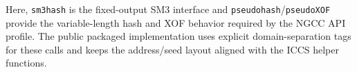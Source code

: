Here, \texttt{sm3hash} is the fixed-output SM3 interface and
\texttt{pseudohash}/\texttt{pseudoXOF} provide the variable-length hash and XOF
behavior required by the NGCC API profile. The public packaged implementation
uses explicit domain-separation tags for these calls and keeps the
address/seed layout aligned with the ICCS helper functions.
